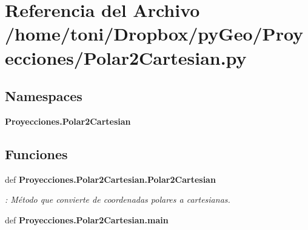 \section{Referencia del Archivo /home/toni/\-Dropbox/py\-Geo/\-Proyecciones/\-Polar2\-Cartesian.py}
\label{Polar2Cartesian_8py}
\subsection*{Namespaces}
\begin{DoxyCompactItemize}
\item 
{\bf Proyecciones.\-Polar2\-Cartesian}
\end{DoxyCompactItemize}
\subsection*{Funciones}
\begin{DoxyCompactItemize}
\item 
def {\bf Proyecciones.\-Polar2\-Cartesian.\-Polar2\-Cartesian}
\begin{DoxyCompactList}\small\item\em \-: Método que convierte de coordenadas polares a cartesianas. \end{DoxyCompactList}\item 
def {\bf Proyecciones.\-Polar2\-Cartesian.\-main}
\end{DoxyCompactItemize}
